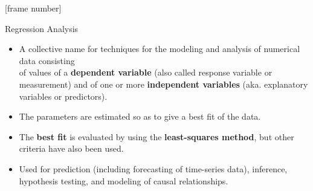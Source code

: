 \documentclass[aspectratio=169,t]{beamer}
\begin{document}
  {
    [frame number]
    \begin{frame}{Regression Analysis}
    \begin{itemize}
      \item A collective name for techniques for the modeling and analysis of numerical data consisting \\ of values of a \textbf{{\color{airforceblue}dependent variable}} (also called response variable or measurement) and of one or more \textbf{{\color{airforceblue}independent variables}} (aka. explanatory variables or predictors).
      \item The parameters are estimated so as to give a best fit of the data.
      \item The \textbf{{\color{airforceblue}best fit}} is evaluated by using the \textbf{{\color{airforceblue}least-squares method}}, but other criteria have also been used.
      \item Used for prediction (including forecasting of time-series data), inference, hypothesis testing, and modeling of causal relationships.
    \end{itemize}
    \hspace{4.5cm}
    \end{frame}
  }
\end{document}
